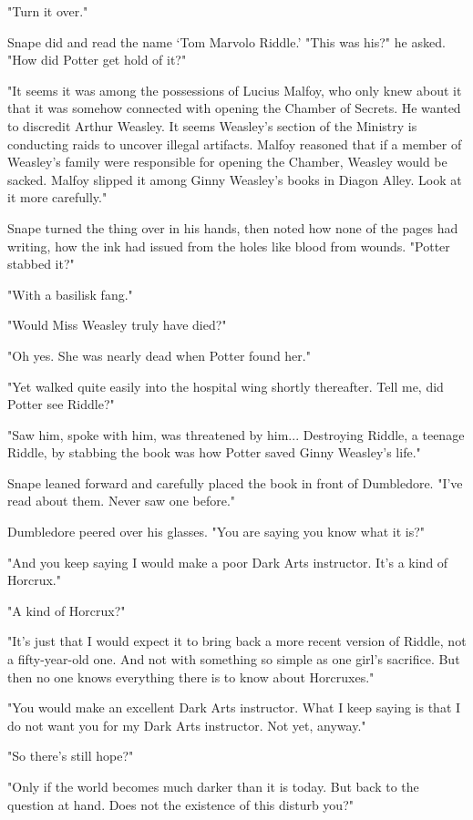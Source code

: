 \documentclass[a4paper,11pt]{article}
\begin{document}
"Turn it over."

Snape did and read the name `Tom Marvolo Riddle.' "This was his?" he asked. "How did Potter get hold of it?"

"It seems it was among the possessions of Lucius Malfoy, who only knew about it that it was somehow connected with opening the Chamber of Secrets. He wanted to discredit Arthur Weasley. It seems Weasley's section of the Ministry is conducting raids to uncover illegal artifacts. Malfoy reasoned that if a member of Weasley's family were responsible for opening the Chamber, Weasley would be sacked. Malfoy slipped it among Ginny Weasley's books in Diagon Alley. Look at it more carefully."

Snape turned the thing over in his hands, then noted how none of the pages had writing, how the ink had issued from the holes like blood from wounds. "Potter stabbed it?"

"With a basilisk fang."

"Would Miss Weasley truly have died?"

"Oh yes. She was nearly dead when Potter found her."

"Yet walked quite easily into the hospital wing shortly thereafter. Tell me, did Potter see Riddle?"

"Saw him, spoke with him, was threatened by him... Destroying Riddle, a teenage Riddle, by stabbing the book was how Potter saved Ginny Weasley's life."

Snape leaned forward and carefully placed the book in front of Dumbledore. "I've read about them. Never saw one before."

Dumbledore peered over his glasses. "You are saying you know what it is?"

"And you keep saying I would make a poor Dark Arts instructor. It's a kind of Horcrux."

"A kind of Horcrux?"

"It's just that I would expect it to bring back a more recent version of Riddle, not a fifty-year-old one. And not with something so simple as one girl's sacrifice. But then no one knows everything there is to know about Horcruxes."

"You would make an excellent Dark Arts instructor. What I keep saying is that I do not want you for my Dark Arts instructor. Not yet, anyway."

"So there's still hope?"

"Only if the world becomes much darker than it is today. But back to the question at hand. Does not the existence of this disturb you?"
\end{document}
